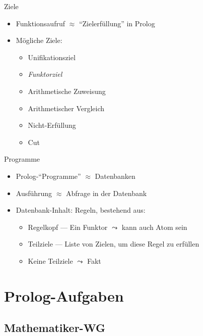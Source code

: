\documentclass{beamer}
\begin{document}
\begin{frame}{Ziele}

	\begin{itemize}
		\item Funktionsaufruf $\approx$ \enquote{Zielerfüllung} in Prolog
		\item Mögliche Ziele:
		\begin{itemize}
			\item Unifikationsziel
                        \item \emph{Funktorziel}
			\item Arithmetische Zuweisung
			\item Arithmetischer Vergleich
			\item Nicht-Erfüllung
			\item Cut
		\end{itemize}
	\end{itemize}
\end{frame}


\begin{frame}{Programme}
	\begin{itemize}
		\item Prolog-\enquote{Programme} $\approx$ Datenbanken
		\item Ausführung $\approx$ Abfrage in der Datenbank
		\item Datenbank-Inhalt: Regeln, bestehend aus:
		\begin{itemize}
			\item Regelkopf --- Ein Funktor $\leadsto$ kann auch Atom sein
			\item Teilziele --- Liste von Zielen, um diese Regel zu erfüllen
			\item Keine Teilziele $\leadsto$ Fakt
		\end{itemize}
	\end{itemize}
\end{frame}

\section{Prolog-Aufgaben}

\subsection{Mathematiker-WG}
\end{document}
